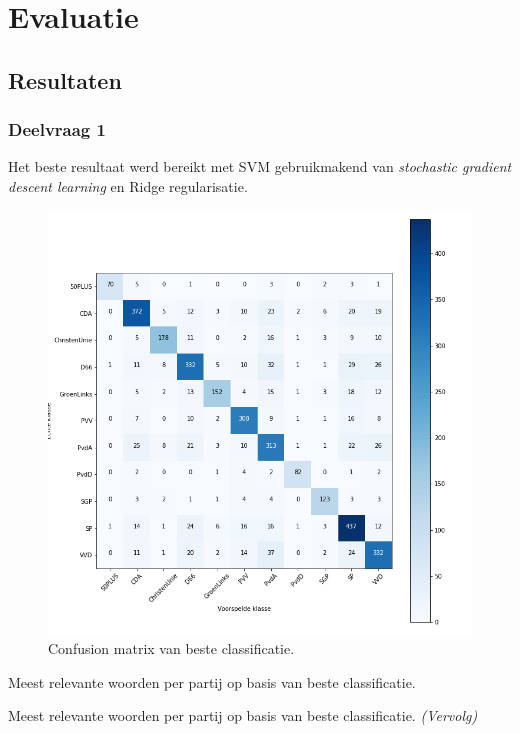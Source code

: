 \section{Evaluatie}
\label{sec:eva}

\subsection{Resultaten}

\subsubsection{Deelvraag 1}
Het beste resultaat werd bereikt met SVM gebruikmakend van \textit{stochastic gradient descent learning} en Ridge regularisatie.

\begin{figure}[H]
  \caption{Confusion matrix van beste classificatie.}
  \centering
    \includegraphics[width=0.6\paperwidth]{Verslag/confusionmatrix.png}
\end{figure}

\begin{table}[H] 
\caption{Meest relevante woorden per partij op basis van beste classificatie.} 
\label{tab:MostImportantWordsWithoutNames} 
\centering 
 
\end{table} 
\addtocounter{table}{-1} 
\begin{table}[H] 
\caption{Meest relevante woorden per partij op basis van beste classificatie. \emph{(Vervolg)}} 
\centering 
 
\end{table}

